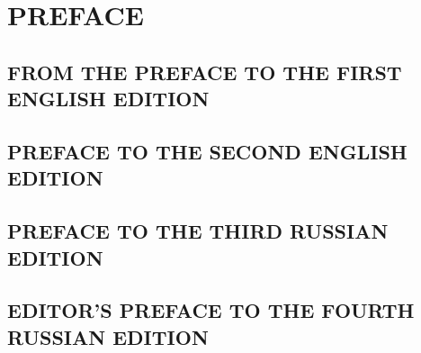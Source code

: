 \chapter{PREFACE}
\section*{FROM THE PREFACE TO THE FIRST ENGLISH EDITION}

\section*{PREFACE TO THE SECOND ENGLISH EDITION}

\section*{PREFACE TO THE THIRD RUSSIAN EDITION}

\section*{EDITOR’S PREFACE TO THE FOURTH RUSSIAN EDITION}
